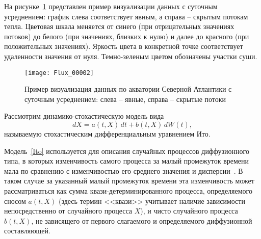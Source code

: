 На рисунке~\ref{fig_flux_example} представлен пример визуализации данных с суточным усреднением: график слева соответствует явным, а справа -- скрытым потокам тепла. Цветовая шкала меняется от синего (при отрицательных значениях потоков) до белого (при значениях, близких к нулю) и далее до красного (при положительных значениях). Яркость цвета в конкретной точке соответствует удаленности значения от нуля. Темно-зеленым цветом обозначены участки суши.

\begin{figure}[!h]
	\centering
	\texttt{[image: Flux\_00002]}
	\caption{Пример визуализация данных по акватории Северной Атлантики с суточным усреднением: слева -- явные, справа -- скрытые потоки}
	\label{fig_flux_example}
\end{figure}

Рассмотрим динамико-стохастическую модель вида
\begin{equation}
	\label{Ito}
	dX = a(t,X)\,dt + b(t, X)\,dW(t), 
\end{equation}
называемую стохастическим дифференциальным уравнением Ито.

Модель~\eqref{Ito} используется для описания случайных процессов диффузионного типа, в которых изменчивость самого процесса за малый промежуток времени мала по сравнению с изменчивостью его среднего значения и дисперсии~\cite{jin2020controls,van2021characterisation}. В таком случае за указанный малый промежуток времени эта изменчивость может рассматриваться как сумма квази-детерминированного процесса, определяемого сносом $a(t, X)$ (здесь термин <<квази>> учитывает наличие зависимости непосредственно от случайного процесса $X$), и чисто случайного процесса $b(t, X)$, не зависящего от первого слагаемого и определяемого диффузионной составляющей.

